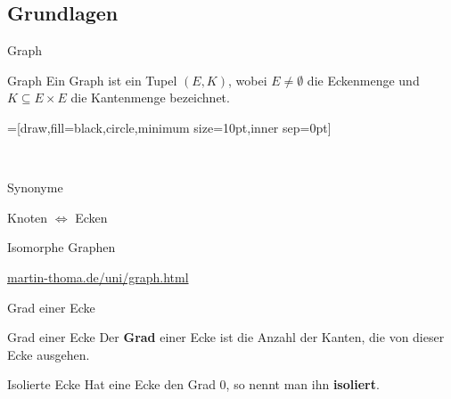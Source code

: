 \subsection{Grundlagen}
\begin{frame}{Graph}
\begin{block}{Graph}
Ein Graph ist ein Tupel $(E, K)$, wobei $E \neq \emptyset$ die Eckenmenge und 
$K \subseteq E \times E$ die 
Kantenmenge bezeichnet.
\end{block}
\pause
{}=[draw,fill=black,circle,minimum size=10pt,inner sep=0pt]

\begin{gallery}
    \\
\end{gallery}
\end{frame}

\begin{frame}{Synonyme}

\begin{center}
\Huge{Knoten $\Leftrightarrow$ Ecken}
\end{center}

\end{frame}


\begin{frame}{Isomorphe Graphen}
\begin{center}
\href{http://www.martin-thoma.de/uni/graph.html}{martin-thoma.de/uni/graph.html}
\end{center}
\end{frame}

\begin{frame}{Grad einer Ecke}
\begin{block}{Grad einer Ecke}
Der \textbf{Grad} einer Ecke ist die Anzahl der Kanten, die von dieser Ecke
ausgehen.
\end{block}

\begin{block}{Isolierte Ecke}
Hat eine Ecke den Grad 0, so nennt man ihn \textbf{isoliert}.
\end{block}

\begin{gallery}
    \\
\end{gallery}
\end{frame}

